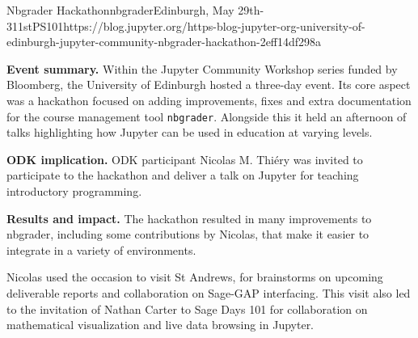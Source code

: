 \begin{event}{Nbgrader Hackathon}{nbgrader}{Edinburgh, May
    29th-311st}{PS}{10}{1}{https://blog.jupyter.org/https-blog-jupyter-org-university-of-edinburgh-jupyter-community-nbgrader-hackathon-2eff14df298a}

  \textbf{Event summary.} Within the Jupyter Community Workshop series
  funded by Bloomberg, the University of Edinburgh hosted a three-day
  event. Its core aspect was a hackathon focused on adding
  improvements, fixes and extra documentation for the course
  management tool \texttt{nbgrader}. Alongside this it held an
  afternoon of talks highlighting how Jupyter can be used in education
  at varying levels.

  \textbf{ODK implication.} ODK participant Nicolas M. Thiéry was
  invited to participate to the hackathon and deliver a talk on
  Jupyter for teaching introductory programming.

  \textbf{Results and impact.} The hackathon resulted in many
  improvements to nbgrader, including some contributions by Nicolas,
  that make it easier to integrate in a variety of environments.

  Nicolas used the occasion to visit St Andrews, for brainstorms on
  upcoming deliverable reports and collaboration on Sage-GAP
  interfacing. This visit also led to the invitation of Nathan Carter
  to Sage Days 101 for collaboration on mathematical visualization and
  live data browsing in Jupyter.
\end{event}
